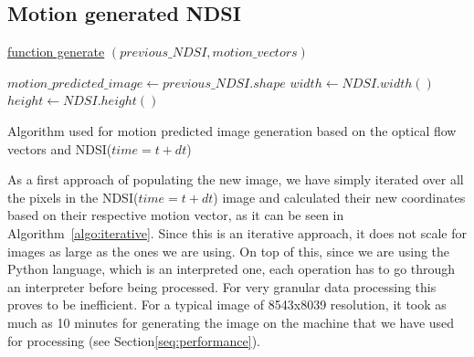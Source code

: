 \documentclass[12pt, a4paper]{report}
\begin{document}

	\subsection{Motion generated NDSI}
	\label{seq:motion_ndsi_implementation}
	
	\begin{algorithm}
			
			\underline{function generate} $(previous\_NDSI, motion\_vectors)$\;
			
			$motion\_predicted\_image \gets previous\_NDSI.shape$\;
			$width \gets NDSI.width()$\;
			$height \gets NDSI.height()$\;
			
			\;

			\caption{Algorithm used for motion predicted image generation based on the optical flow vectors and NDSI(\(time=t+dt\))}
			\label{algo:change}
	\end{algorithm}
	
	\par As a first approach of populating the new image, we have simply iterated over all
	the pixels in the NDSI(\(time=t+dt\)) image and calculated their new coordinates
	based on their respective motion vector, as it can be seen in Algorithm~\ref{algo:iterative}. Since this
	is an iterative approach, it does not scale for images as large as the ones we are using.
	On top of this, since we are using the Python language, which is an interpreted one,
	each operation has to go through an interpreter before being processed. For very granular data
	processing this proves to be inefficient. For a typical image of 8543x8039 resolution, it
	took as much as 10 minutes for generating the image on the machine that we have used for processing (see Section\ref{seq:performance}).
	
\end{document}

